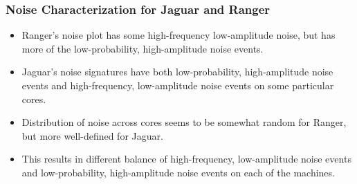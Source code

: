 \begin{frame}
\frametitle{Noise Characterization for Jaguar and Ranger}
\begin{itemize}
\item \small Ranger's noise plot has some high-frequency low-amplitude
  noise, but has more of the low-probability, high-amplitude noise
  events.  
\item \small Jaguar's noise signatures have both low-probability,
high-amplitude noise events and  high-frequency, low-amplitude 
noise events on some particular cores. 
\item \small Distribution of noise across cores seems to be somewhat
random for Ranger, but more well-defined for Jaguar. 
\item \small This results in different balance of high-frequency,
  low-amplitude noise events and low-probability, high-amplitude noise
  events on each of the machines. 
\end{itemize}
\end{frame}








